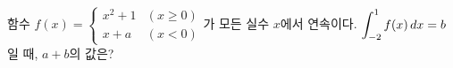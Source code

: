 함수 $f(x)=\begin{cases} x^2+1 & (x\ge 0) \\ x+a & (x<0) \end{cases}$가 모든 실수 $x$에서 연속이다. $\displaystyle\int_{-2}^{1} f(x)\mkern3mu dx=b$일 때, $a+b$의 값은? 
